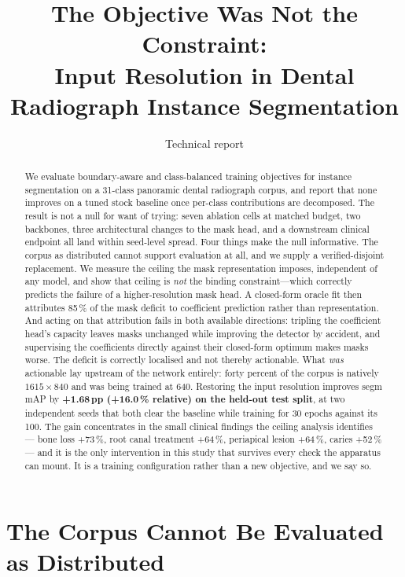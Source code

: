 \documentclass[11pt,letterpaper]{article}
\title{\bfseries The Objective Was Not the Constraint:\\
Input Resolution in Dental Radiograph Instance Segmentation}
\author{Technical report}
\date{}
\begin{document}
\maketitle

\begin{abstract}
\noindent
We evaluate boundary-aware and class-balanced training objectives for instance
segmentation on a 31-class panoramic dental radiograph corpus, and report that
none improves on a tuned stock baseline once per-class contributions are
decomposed. The result is not a null for want of trying: seven ablation cells at
matched budget, two backbones, three architectural changes to the mask head, and
a downstream clinical endpoint all land within seed-level spread. Four things
make the null informative. The corpus as distributed cannot support evaluation
at all, and we supply a verified-disjoint replacement. We measure the ceiling
the mask representation imposes, independent of any model, and show that ceiling
is \emph{not} the binding constraint---which correctly predicts the failure of a
higher-resolution mask head. A closed-form oracle fit then attributes 85\,\% of
the mask deficit to coefficient prediction rather than representation. And
acting on that attribution fails in both available directions: tripling the
coefficient head's capacity leaves masks unchanged while improving the detector
by accident, and supervising the coefficients directly against their closed-form
optimum makes masks worse. The deficit is correctly localised and not thereby
actionable. What \emph{was} actionable lay upstream of the network entirely:
forty percent of the corpus is natively $1615\times840$ and was being trained
at 640. Restoring the input resolution improves segm mAP by \textbf{+1.68\,pp
(+16.0\,\% relative) on the held-out test split}, at two independent seeds
that both clear the baseline while training for 30 epochs against its 100. The
gain concentrates in the small clinical findings the ceiling analysis
identifies --- bone loss +73\,\%, root canal treatment +64\,\%, periapical
lesion +64\,\%, caries +52\,\% --- and it is the only intervention in this
study that survives every check the apparatus can mount. It is a training
configuration rather than a new objective, and we say so.
\end{abstract}

\section{The Corpus Cannot Be Evaluated as Distributed}
\end{document}
